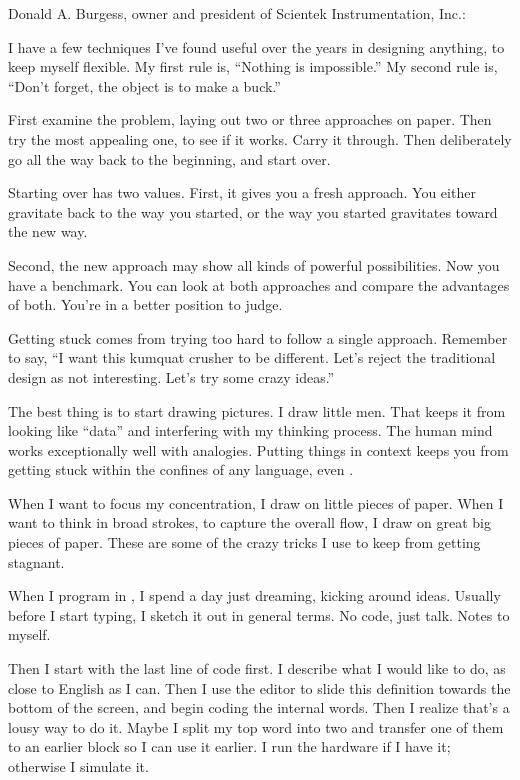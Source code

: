 \begin{interview}
Donald A. Burgess, owner and president of Scientek Instrumentation,
Inc.:

\begin{tfquot}
I have a few techniques I've found useful over the years in designing
anything, to keep myself flexible. My first rule is, ``Nothing is impossible.''
My second rule is, ``Don't forget, the object is to make a buck.''

First examine the problem, laying out two or three approaches on paper.
Then try the most appealing one, to see if it works. Carry it through. Then
deliberately go all the way back to the beginning, and start over.

Starting over has two values. First, it gives you a fresh approach. You
either gravitate back to the way you started, or the way you started
gravitates toward the new way.

Second, the new approach may show all kinds of powerful possibilities. Now
you have a benchmark. You can look at both approaches and compare the
advantages of both. You're in a better position to judge.

Getting stuck comes from trying too hard to follow a single approach.
Remember to say, ``I want this kumquat crusher to be different. Let's
reject the traditional design as not interesting. Let's try some crazy
ideas.''

The best thing is to start drawing pictures. I draw little men. That keeps
it from looking like ``data'' and interfering with my thinking process. The
human mind works exceptionally well with analogies. Putting things in
context keeps you from getting stuck within the confines of any language,
even \Forth{}.

When I want to focus my concentration, I draw on little pieces of paper.
When I want to think in broad strokes, to capture the overall flow, I draw
on great big pieces of paper. These are some of the crazy tricks I use to keep
from getting stagnant.

When I program in \Forth{}, I spend a day just dreaming, kicking around
ideas. Usually before I start typing, I sketch it out in general terms. No
code, just talk. Notes to myself.

Then I start with the last line of code first. I describe what I would like
to do, as close to English as I can. Then I use the editor to slide this
definition towards the bottom of the screen, and begin coding the internal
words. Then I realize that's a lousy way to do it. Maybe I split my top word
into two and transfer one of them to an earlier block so I can use it earlier.
I run the hardware if I have it; otherwise I simulate it.


\end{tfquot}
\end{interview}
